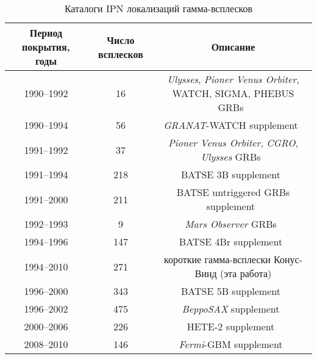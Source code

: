 \begin{table} [h]
 \centering
 \caption{Каталоги IPN локализаций гамма-всплесков}\label{tab:IPN_cat}
\scriptsize
  \begin{center}
  \begin{tabular}{ccc}
  \hline
  \hline
  Период покрытия, годы & Число всплесков & Описание \\
  \hline
1990--1992 &16 &\textit{Ulysses}, \textit{Pioner Venus Orbiter}, WATCH, SIGMA, PHEBUS GRBs~\citep{Hurley_2000ApJ} \\
1990--1994 &56 &\textit{GRANAT}-WATCH supplement~\citep{Hurley_2000ApJS_WATCH} \\
1991--1992 &37 &\textit{Pioner Venus Orbiter}, \textit{CGRO}, \textit{Ulysses} GRBs~\citep{Laros_1998ApJS}\\
1991--1994 &218 &BATSE 3B supplement~\citep{Hurley_1999ApJSa}\\
1991--2000 &211 &BATSE untriggered GRBs supplement~\citep{Hurley_2005ApJS_BATSE_untrig}\\
1992--1993 &9 &\textit{Mars Observer} GRBs~\citep{Laros_1997ApJS}\\
1994--1996 &147 &BATSE 4Br supplement~\citep{Hurley_1999ApJS_BATSE_4Br}\\
1994--2010 &271 &короткие гамма-всплески Конус-Винд (эта работа)\\
1996--2000 &343 &BATSE 5B supplement~\citep{Hurley_2011ApJS_BATSE_5B}\\
1996--2002 &475 &\textit{BeppoSAX} supplement~\citep{Hurley_2010ApJS_BeppoSAX}\\
2000--2006 &226 &HETE-2 supplement~\citep{Hurley_2011ApJS_HETE2}\\
2008--2010 &146 &\textit{Fermi}-GBM supplement~\citep{Hurley_2013ApJS_GBM}\\
  \hline
  \hline
  \end{tabular}
  \end{center}
\end{table}


\clearpage